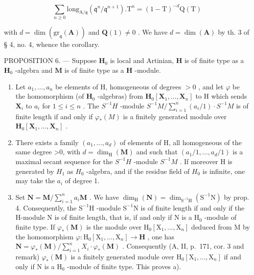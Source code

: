 \[
\sum_ {n \geqslant 0} \mathrm{long} _ {\mathrm{A} / \mathfrak {q}} (\mathfrak {q} ^ {n} / \mathfrak {q} ^ {n + 1}). \mathrm{T} ^ {n} = (1 - \mathrm{T}) ^ {- d} \mathrm{Q} (\mathrm{T})
\]

with \(d = \dim(\mathrm{gr}_{\mathfrak{q}}(\mathbf{A}))\) and \(\mathbf{Q}(1) \neq 0\) . We have \(d = \dim(\mathbf{A})\) by th. 3 of § 4, no. 4, whence the corollary.

PROPOSITION 6. --- Suppose \(\mathbf{H}_{0}\) is local and Artinian, \(\mathbf{H}\) is of finite type as a \(\mathbf{H}_{0}\) -algebra and \(\mathbf{M}\) is of finite type as a \(\mathbf{H}\) -module.

\begin{enumerate}
\def\labelenumi{\alph{enumi})}
\item
  Let \(a_1, \ldots, a_n\) be elements of H, homogeneous of degrees \(> 0\) , and let \(\varphi\) be the homomorphism (of \(\mathbf{H}_0\) -algebras) from \(\mathbf{H}_0[\mathbf{X}_1, \ldots, \mathbf{X}_n]\) to H which sends \(\mathbf{X}_i\) to \(a_i\) for \(1 \leqslant i \leqslant n\) . The \(S^{-1}H\) -module \(S^{-1}M / \sum_{i=1}^{n}(a_i/1) \cdot S^{-1}M\) is of finite length if and only if \(\varphi_*(M)\) is a finitely generated module over \(\mathbf{H}_0[\mathbf{X}_1, \ldots, \mathbf{X}_n]\) .
\item
  There exists a family \((a_{1},...,a_{d})\) of elements of H, all homogeneous of the same degree \textgreater0, with \(d=\dim_{\mathrm{H}}(\mathbf{M})\) and such that \((a_{1}/1,...,a_{d}/1)\) is a maximal secant sequence for the \(S^{-1}H\) -module \(S^{-1}M\) . If moreover H is generated by \(H_{1}\) as \(H_{0}\) -algebra, and if the residue field of \(H_{0}\) is infinite, one may take the \(a_{i}\) of degree 1.
\item
  Set \(\mathbf{N} = \mathbf{M} / \sum_{i=1}^{n} a_i \mathbf{M}\) . We have \(\dim_{\mathrm{H}}(\mathbf{N}) = \dim_{\mathrm{S}^{-1}\mathrm{H}}(\mathrm{S}^{-1}\mathrm{N})\) by prop. 4. Consequently, the \(\mathrm{S}^{-1}\mathrm{H}\) -module \(\mathrm{S}^{-1}\mathrm{N}\) is of finite length if and only if the H-module N is of finite length, that is, if and only if N is a \(\mathrm{H}_0\) -module of finite type. If \(\varphi_*(\mathbf{M})\) is the module over \(\mathrm{H}_0[\mathrm{X}_1, ..., \mathrm{X}_n]\) deduced from M by the homomorphism \(\varphi : \mathrm{H}_0[\mathrm{X}_1, ..., \mathrm{X}_n] \to \mathbf{H}\) , one has \(\mathbf{N} = \varphi_*(\mathbf{M}) / \sum_{i=1}^{n} X_i \cdot \varphi_*(\mathbf{M})\) . Consequently (A, II, p.~171, cor. 3 and remark) \(\varphi_*(\mathbf{M})\) is a finitely generated module over \(\mathrm{H}_0[\mathrm{X}_1, ..., \mathrm{X}_n]\) if and only if N is a \(\mathrm{H}_0\) -module of finite type. This proves a).
\end{enumerate}

